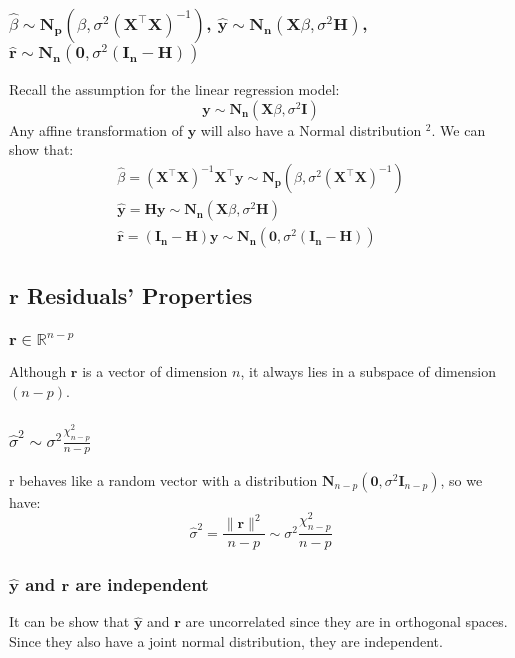 \documentclass[11pt,a4paper]{article}
\begin{document}
\subsubsection{$\hat{\beta}\sim \mathbf{N}_{\mathbf{p}}\left(\beta, \sigma^{2}\left(\mathbf{X}^{\top} \mathbf{X}\right)^{-1}\right)$, $\hat{\mathbf{y}}\sim\mathbf{N}_{\mathbf{n}}\left(\mathbf{X} \beta, \sigma^{2} \mathbf{H}\right)$, $\hat{\mathbf{r}}\sim \mathbf{N}_{\mathbf{n}}\left(\mathbf{0}, \sigma^{2}\left(\mathbf{I}_{\mathbf{n}}-\mathbf{H}\right)\right)$}
Recall the assumption for the linear regression model:
$$
\mathbf{y} \sim \mathbf{N}_{\mathbf{n}}\left(\mathbf{X} \beta, \sigma^{2} \mathbf{I}\right)
$$
Any affine transformation of $\mathbf{y}$ will also have a Normal distribution $^{2}$.
We can show that:
$$
\begin{gathered}
\hat{\beta}=\left(\mathbf{X}^{\top} \mathbf{X}\right)^{-1} \mathbf{X}^{\top} \mathbf{y} \sim \mathbf{N}_{\mathbf{p}}\left(\beta, \sigma^{2}\left(\mathbf{X}^{\top} \mathbf{X}\right)^{-1}\right) \\
\hat{\mathbf{y}}=\mathbf{H} \mathbf{y} \sim \mathbf{N}_{\mathbf{n}}\left(\mathbf{X} \beta, \sigma^{2} \mathbf{H}\right) \\
\hat{\mathbf{r}}=\left(\mathbf{I}_{\mathbf{n}}-\mathbf{H}\right) \mathbf{y} \sim \mathbf{N}_{\mathbf{n}}\left(\mathbf{0}, \sigma^{2}\left(\mathbf{I}_{\mathbf{n}}-\mathbf{H}\right)\right)
\end{gathered}
$$
\subsection{$\mathbf{r}$ Residuals’ Properties}
\subsubsection{$\mathbf{r}\in \mathbb{R}^{n-p}$}
Although $\mathbf{r}$ is a vector of dimension $n$, it always lies in a subspace of dimension $(n − p)$.
\subsubsection{$\hat{\sigma}^{2}\sim\sigma^{2} \frac{\chi_{n-p}^{2}}{n-p}$}
r behaves like a random vector with a distribution $\mathbf{N}_{n-p}\left(\mathbf{0}, \sigma^{2} \mathbf{I}_{n-p}\right)$, so we have:
$$
\hat{\sigma}^{2}=\frac{\|\mathbf{r}\|^{2}}{n-p} \sim \sigma^{2} \frac{\chi_{n-p}^{2}}{n-p}
$$
\subsubsection{$\hat{\mathbf{y}}$ and $\boldsymbol{r}$ are independent}
It can be show that $\hat{\mathbf{y}}$ and $\boldsymbol{r}$ are uncorrelated since they are in orthogonal spaces. Since they also have a joint normal distribution, they are independent.
\end{document}
